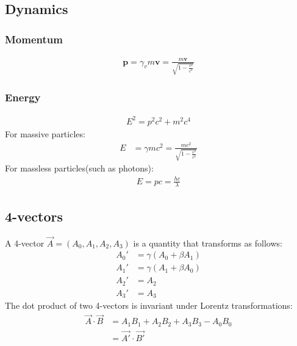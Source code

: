 \documentclass[a4paper]{article}
\newcommand{\ve}[1]{
  \ensuremath{\bm{#1}}}	               %
\newcommand{\fve}[1]{
  \ensuremath{\vec{#1}}}               %
\begin{document}
\begin{multicols*}{2}
\subsection{Dynamics}
\subsubsection{Momentum}
\begin{align*}
  \ve{p}=\gamma_vm\ve{v}=\frac{m\ve{v}}{\sqrt{1-\frac{v^2}{c^2}}}
\end{align*}
\subsubsection{Energy}
\begin{align*}
  E^2=p^2c^2+m^2c^4
\end{align*}
For massive particles:
\begin{align*}
  E&=\gamma mc^2=\frac{mc^2}{\sqrt{1-\frac{v^2}{c^2}}}
\end{align*}
For massless particles(such as photons):
\begin{align*}
  E=pc=\frac{hc}{\lambda}
\end{align*}
\subsection{4-vectors}
A 4-vector $\fve{A}=(A_0,A_1,A_2,A_3)$ is a quantity that transforms as follows:
\begin{align*}
  A_0'&= \gamma(A_0+\beta A_1)\\
  A_1'&= \gamma(A_1+\beta A_0)\\
  A_2'&= A_2\\
  A_3'&= A_3
\end{align*}
The dot product of two 4-vectors is invariant under Lorentz transformations:
\begin{align*}
  \fve{A}\cdot\fve{B} &= A_1B_1 + A_2B_2 + A_3B_3 - A_0B_0\\
  &= \fve{A'}\cdot\fve{B'}
\end{align*}

\end{multicols*}
\end{document}
